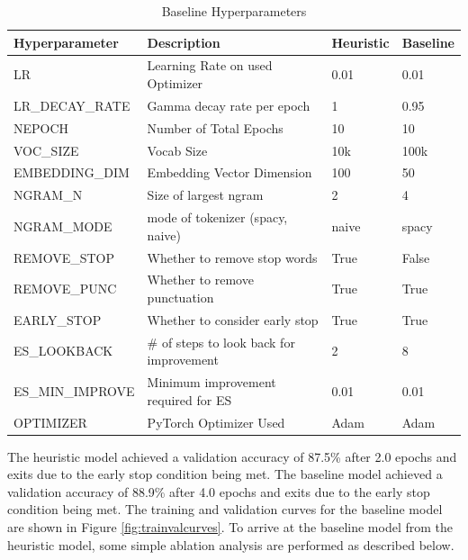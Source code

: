 \documentclass[a4paper,10pt]{article}
\begin{document}
\begin{table}[!htbp]
\begin{tabular}{| l | l | l | l |}
\hline
Hyperparameter   & Description                                &  Heuristic & Baseline  \\
\hline
LR               & Learning Rate on used Optimizer            & 0.01             & 0.01           \\
LR\_DECAY\_RATE  & Gamma decay rate per epoch                 & 1                & 0.95           \\
NEPOCH           & Number of Total Epochs                     & 10               & 10             \\
VOC\_SIZE        & Vocab Size                                 & 10k              & 100k           \\
EMBEDDING\_DIM   & Embedding Vector Dimension                 & 100              & 50             \\
NGRAM\_N         & Size of largest ngram                      & 2                & 4              \\
NGRAM\_MODE      & mode of tokenizer (spacy, naive)           & naive            & spacy          \\
REMOVE\_STOP     & Whether to remove stop words               & True             & False          \\
REMOVE\_PUNC     & Whether to remove punctuation              & True             & True           \\
EARLY\_STOP      & Whether to consider early stop             & True             & True           \\
ES\_LOOKBACK     & \# of steps to look back for improvement & 2                & 8              \\
ES\_MIN\_IMPROVE & Minimum improvement required for ES        & 0.01             & 0.01           \\
OPTIMIZER        & PyTorch Optimizer Used                     & Adam             & Adam           \\
\hline
\end{tabular}
\caption{Baseline Hyperparameters}\label{tbl:hyperparams}
\end{table}

\par
\justify
The heuristic model achieved a validation accuracy of 87.5\% after 2.0 epochs and exits due to the early stop condition being met. The baseline model achieved a validation accuracy of 88.9\% after 4.0 epochs and exits due to the early stop condition being met. The training and validation curves for the baseline model are shown in Figure \ref{fig:trainvalcurves}. To arrive at the baseline model from the heuristic model, some simple ablation analysis are performed as described below.
\end{document}
